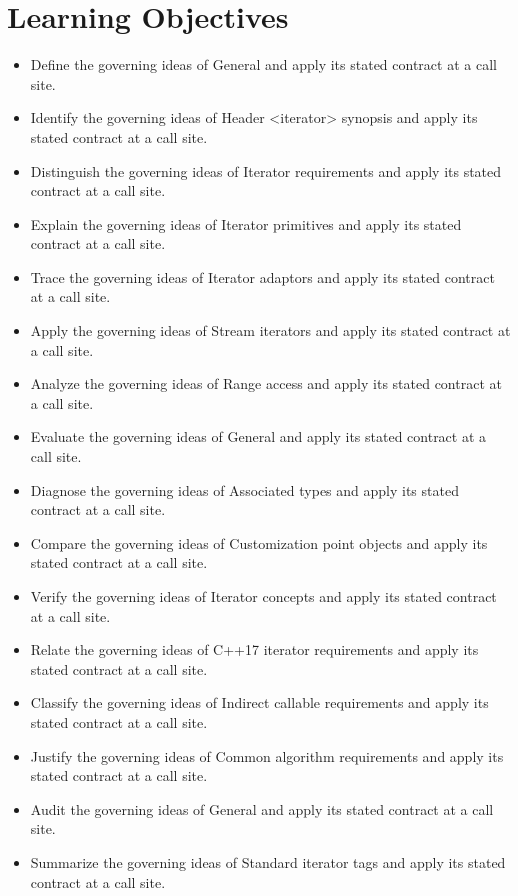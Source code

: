 \documentclass[11pt,letterpaper]{article}
\begin{document}
\section{Learning Objectives}
\begin{itemize}[label=\textcolor{CornellReferenceTeal}{$\blacktriangleright$}]
\item Define the governing ideas of General and apply its stated contract at a call site.
\item Identify the governing ideas of Header <iterator> synopsis and apply its stated contract at a call site.
\item Distinguish the governing ideas of Iterator requirements and apply its stated contract at a call site.
\item Explain the governing ideas of Iterator primitives and apply its stated contract at a call site.
\item Trace the governing ideas of Iterator adaptors and apply its stated contract at a call site.
\item Apply the governing ideas of Stream iterators and apply its stated contract at a call site.
\item Analyze the governing ideas of Range access and apply its stated contract at a call site.
\item Evaluate the governing ideas of General and apply its stated contract at a call site.
\item Diagnose the governing ideas of Associated types and apply its stated contract at a call site.
\item Compare the governing ideas of Customization point objects and apply its stated contract at a call site.
\item Verify the governing ideas of Iterator concepts and apply its stated contract at a call site.
\item Relate the governing ideas of C++17 iterator requirements and apply its stated contract at a call site.
\item Classify the governing ideas of Indirect callable requirements and apply its stated contract at a call site.
\item Justify the governing ideas of Common algorithm requirements and apply its stated contract at a call site.
\item Audit the governing ideas of General and apply its stated contract at a call site.
\item Summarize the governing ideas of Standard iterator tags and apply its stated contract at a call site.
\end{itemize}
\end{document}
